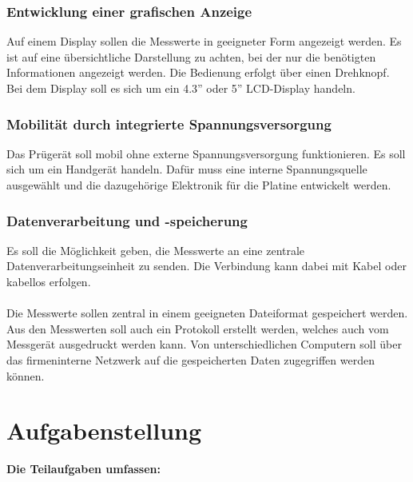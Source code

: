 \subsubsection{Entwicklung einer grafischen Anzeige}
Auf einem Display sollen die Messwerte in geeigneter Form angezeigt werden.
Es ist auf eine übersichtliche Darstellung zu achten, bei der nur die benötigten
Informationen angezeigt werden. Die Bedienung erfolgt über einen Drehknopf.
\\
Bei dem Display soll es sich um ein 4.3'' oder 5'' LCD-Display handeln.

\subsubsection{Mobilität durch integrierte Spannungsversorgung}
Das Prügerät soll mobil ohne externe Spannungsversorgung funktionieren.
Es soll sich um ein Handgerät handeln. Dafür muss eine interne Spannungsquelle ausgewählt
und die dazugehörige Elektronik für die Platine entwickelt werden.

\subsubsection{Datenverarbeitung und -speicherung}
Es soll die Möglichkeit geben, die Messwerte an eine zentrale Datenverarbeitungseinheit zu senden.
Die Verbindung kann dabei mit Kabel oder kabellos erfolgen.
\\
\\
Die Messwerte sollen zentral in einem geeigneten Dateiformat gespeichert werden.
Aus den Messwerten soll auch ein Protokoll erstellt werden, welches auch vom Messgerät
ausgedruckt werden kann. Von unterschiedlichen Computern soll über das firmeninterne Netzwerk
auf die gespeicherten Daten zugegriffen werden können.

\subsubsection{}



\section{Aufgabenstellung}

\textbf{Die Teilaufgaben umfassen:}


